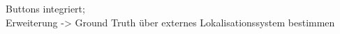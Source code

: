 












%
%
%
%
Buttons integriert;\\
%
Erweiterung -> Ground Truth über externes Lokalisationssystem bestimmen\\


